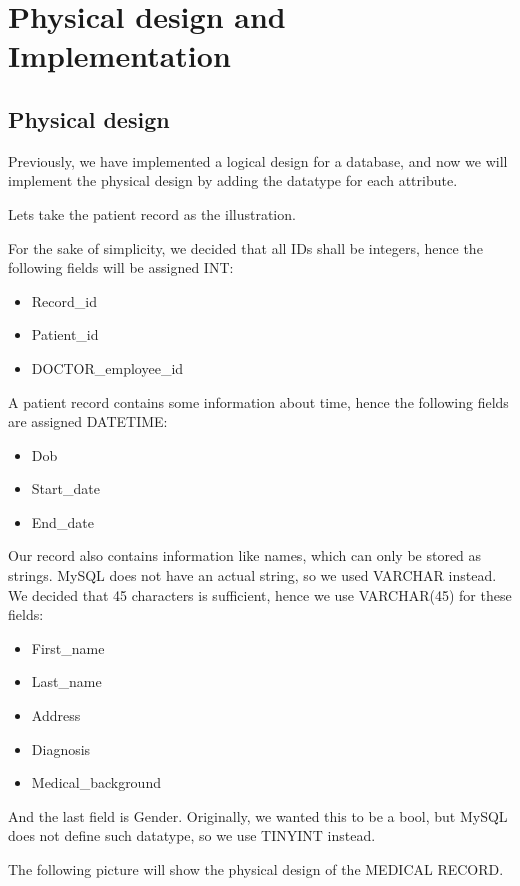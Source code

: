 \documentclass[a4paper]{article}
\numberwithin{equation}{section}
\begin{document}
\newpage

\section{Physical design and Implementation}
\subsection{Physical design}
Previously, we have implemented a logical design for a database, and now we will implement the physical design by adding the datatype for each attribute.

Lets take the patient record as the illustration.

For the sake of simplicity, we decided that all IDs shall be integers, hence the following fields will be assigned INT\@:
\begin{itemize}
  \item Record\_id
  \item Patient\_id
  \item DOCTOR\_employee\_id
\end{itemize}

A patient record contains some information about time, hence the following fields are assigned DATETIME\@:
\begin{itemize}
  \item Dob
  \item Start\_date
  \item End\_date
\end{itemize}

Our record also contains information like names, which can only be stored as strings. MySQL does not have an actual string, so we used VARCHAR instead.
We decided that 45 characters is sufficient, hence we use VARCHAR(45) for these fields:
\begin{itemize}
  \item First\_name
  \item Last\_name
  \item Address
  \item Diagnosis
  \item Medical\_background
\end{itemize}

And the last field is Gender.
Originally, we wanted this to be a bool, but MySQL does not define such datatype, so we use TINYINT instead.

The following picture will show the physical design of the MEDICAL RECORD.
\end{document}
